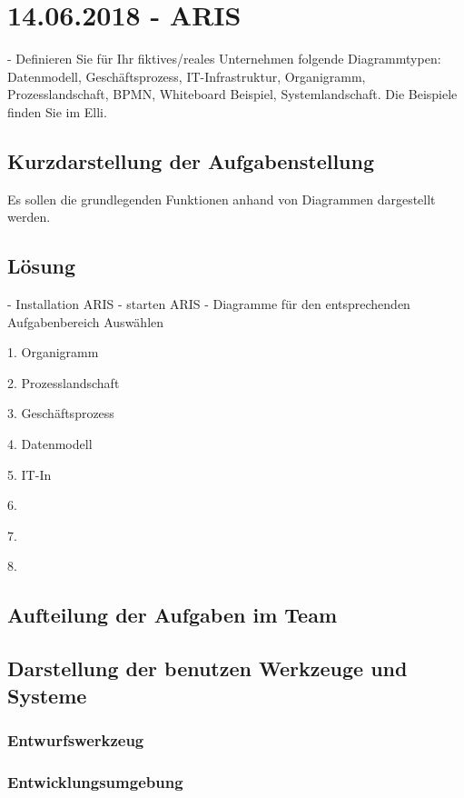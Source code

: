 \section{14.06.2018 - ARIS}
- Definieren Sie für Ihr fiktives/reales Unternehmen folgende Diagrammtypen: Datenmodell, Geschäftsprozess, IT-Infrastruktur, Organigramm, Prozesslandschaft, BPMN, Whiteboard Beispiel, Systemlandschaft. Die Beispiele finden Sie im Elli.

\subsection{Kurzdarstellung der Aufgabenstellung}
Es sollen die grundlegenden Funktionen anhand von Diagrammen dargestellt werden.
\subsection{Lösung}
- Installation ARIS
- starten ARIS
- Diagramme für den entsprechenden Aufgabenbereich Auswählen

1. Organigramm

2. Prozesslandschaft

3. Geschäftsprozess

4. Datenmodell

5. IT-In

6.

7.

8.

\subsection{Aufteilung der Aufgaben im Team}
\subsection{Darstellung der benutzen Werkzeuge und Systeme}
\subsubsection*{Entwurfswerkzeug}
\subsubsection*{Entwicklungsumgebung}

